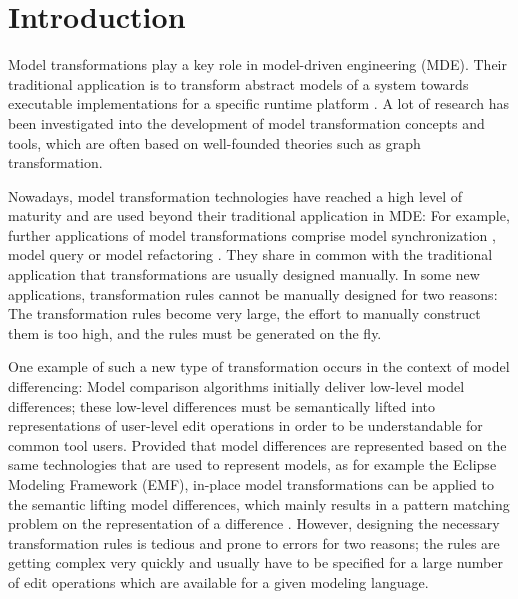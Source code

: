 \documentclass{llncs}
\begin{document}
% 

\section{Introduction}
Model transformations play a key role in model-driven engineering (MDE).
Their traditional application is to transform abstract models of a system 
towards executable implementations for a specific runtime
platform \cite{MDA}\cite{MDAExplained}. 
 A lot of research has been investigated into the
development of model transformation concepts and tools, which 
are often based on well-founded theories such as graph 
transformation.

Nowadays, model transformation technologies have reached a high
level of maturity and are used beyond their traditional application
in MDE: For example, further applications of model transformations  
comprise model synchronization \cite{GiW2009SoSyM}, model query \cite{QVT} or model
refactoring \cite{EMFRefactor}. They share in common with the traditional application
that transformations are usually designed manually. 
In some new applications, transformation rules cannot be manually
designed for two reasons: The transformation rules become very large, 
the effort to manually construct them is too high, and the rules
must be generated on the fly.

One example of such a new type of transformation occurs in the 
context of model differencing: Model comparison algorithms
initially deliver low-level model differences; these low-level
differences must be semantically lifted into representations
of user-level edit operations in order to be understandable
for common tool users. Provided that model differences
are represented based on the same technologies that
are used to represent models, as for example the Eclipse
Modeling Framework (EMF), in-place model transformations
can be applied to the semantic lifting model differences,
which mainly results in a pattern matching problem on the
representation of a difference \cite{KeKT2011ASE}. However, designing the necessary
transformation rules is tedious and prone to errors for
two reasons; the rules are getting complex very quickly and
usually have to be specified for a large number of edit operations
which are available for a given modeling language.
\end{document}
